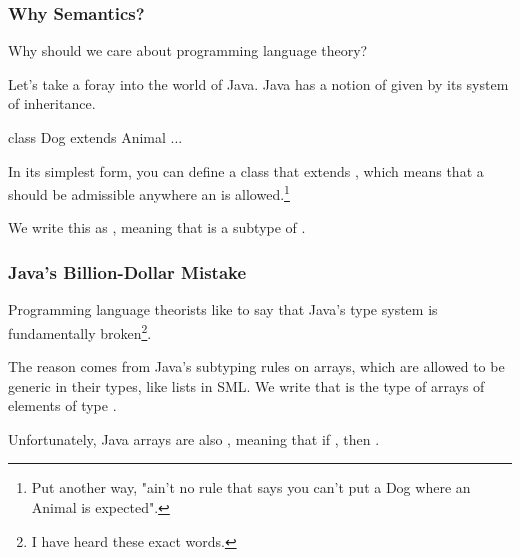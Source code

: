\documentclass[aspectratio=169, handout]{beamer}
\begin{document}

\begin{frame}[fragile]
  \frametitle{Why Semantics?}

  Why should we care about programming language theory?

  \vspace{\fill}

  Let's take a foray into the world of Java. Java has a notion of
   given by its system of inheritance.

  \begin{codeblock}[language=java]
    class Dog extends Animal {
      ...
    }
  \end{codeblock}

  \vspace{\fill}

  In its simplest form, you can define a class  that
  extends , which
  means that a  should be admissible anywhere an
   is allowed.\footnote{Put another way, "ain't no rule
  that says you can't put a Dog where an Animal is expected".}

  \pause
  \vspace{\fill}

  We write this as , meaning that  is a
  subtype of .
\end{frame}

\begin{frame}[fragile]
  \frametitle{Java's Billion-Dollar Mistake}

  Programming language theorists like to say that Java's type system is
  fundamentally broken\footnote{I have heard these exact words.}.

  \pause
  \vspace{\fill}

  The reason comes from Java's subtyping rules on arrays, which are allowed
  to be generic in their types, like lists in SML. We write that 
  is the type of arrays of elements of type .

  \pause
  \vspace{\fill}

  Unfortunately, Java arrays are also , meaning that if
  , then .
\end{frame}
\end{document}
